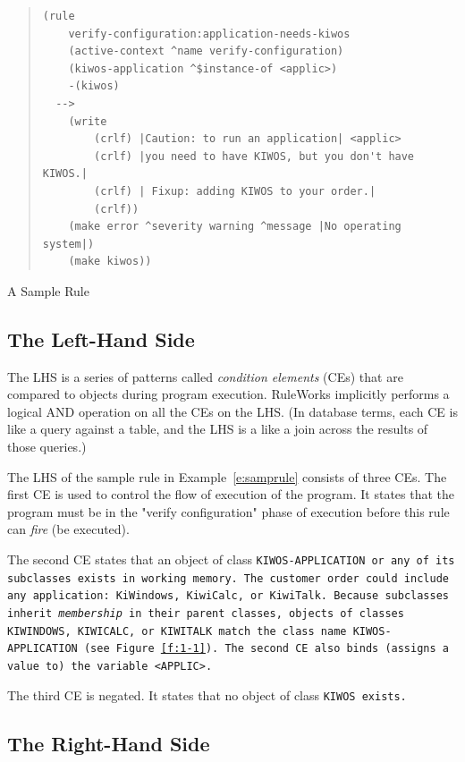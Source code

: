 \begin{example}[h]
\begin{quote}
\begin{verbatim}
(rule
    verify-configuration:application-needs-kiwos
    (active-context ^name verify-configuration)
    (kiwos-application ^$instance-of <applic>)
    -(kiwos)
  -->
    (write
        (crlf) |Caution: to run an application| <applic>
        (crlf) |you need to have KIWOS, but you don't have KIWOS.|
        (crlf) | Fixup: adding KIWOS to your order.|
        (crlf))
    (make error ^severity warning ^message |No operating system|)
    (make kiwos))
\end{verbatim}
\end{quote}
\caption{A Sample Rule}
\label{e:samprule}
\end{example}

\subsection{The Left-Hand Side}

The LHS is a series of patterns called \emph{condition elements} (CEs)
that are compared to objects during program execution.  RuleWorks
implicitly performs a logical AND operation on all the CEs on the
LHS. (In database terms, each CE is like a query against a table, and
the LHS is a like a join across the results of those queries.)

The LHS of the sample rule in Example~\ref{e:samprule} consists of
three CEs. The first CE is used to control the flow of execution of
the program. It states that the program must be in the "verify
configuration" phase of execution before this rule can \emph{fire} (be
executed).

The second CE states that an object of class \tt{KIWOS-APPLICATION} or
any of its subclasses exists in working memory. The customer order
could include any application: \tt{KiWindows}, \tt{KiwiCalc}, or
\tt{KiwiTalk}. Because subclasses inherit \emph{membership} in their
parent classes, objects of classes \tt{KIWINDOWS}, \tt{KIWICALC}, or
\tt{KIWITALK} match the class name \tt{KIWOS-APPLICATION} (see
Figure~\ref{f:1-1}). The second CE also binds (assigns a value to) the
variable \tt{<APPLIC>}.

The third CE is negated. It states that no object of class \tt{KIWOS}
exists.

\subsection{The Right-Hand Side}

